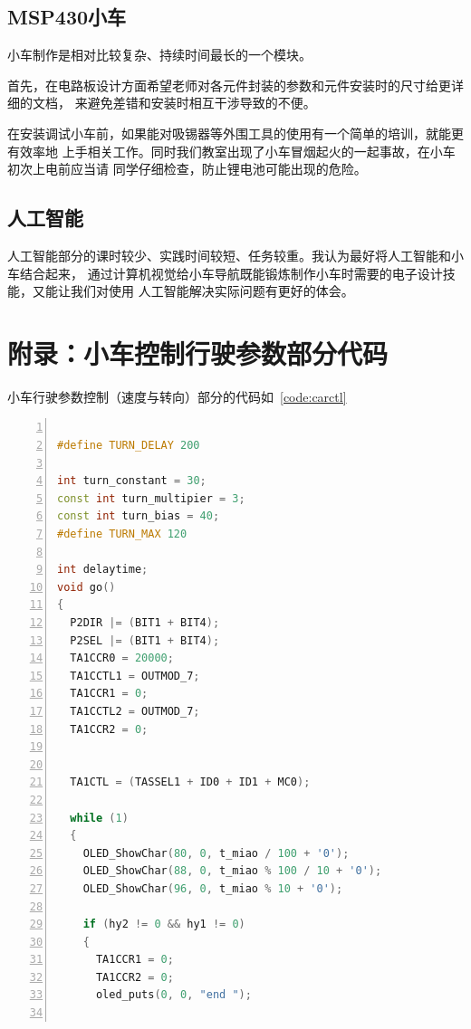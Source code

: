 \documentclass[a4paper,twoside,zihao=5,UTF8]{ctexart}
\begin{document}
\begin{spacing}{1.2}
\subsection{MSP430小车}

小车制作是相对比较复杂、持续时间最长的一个模块。

首先，在电路板设计方面希望老师对各元件封装的参数和元件安装时的尺寸给更详细的文档，
来避免差错和安装时相互干涉导致的不便。

在安装调试小车前，如果能对吸锡器等外围工具的使用有一个简单的培训，就能更有效率地
上手相关工作。同时我们教室出现了小车冒烟起火的一起事故，在小车初次上电前应当请
同学仔细检查，防止锂电池可能出现的危险。

\subsection{人工智能}

人工智能部分的课时较少、实践时间较短、任务较重。我认为最好将人工智能和小车结合起来，
通过计算机视觉给小车导航既能锻炼制作小车时需要的电子设计技能，又能让我们对使用
人工智能解决实际问题有更好的体会。

\clearpage

\appendix
\section*{附录：小车控制行驶参数部分代码}

小车行驶参数控制（速度与转向）部分的代码如~\ref{code:carctl}

\begin{lstlisting}[language=c++,numbers=left,style=CppStyle,caption=作业6,label={code:carctl}]

#define TURN_DELAY 200

int turn_constant = 30;
const int turn_multipier = 3;
const int turn_bias = 40;
#define TURN_MAX 120

int delaytime;
void go()
{
  P2DIR |= (BIT1 + BIT4);
  P2SEL |= (BIT1 + BIT4);
  TA1CCR0 = 20000;        
  TA1CCTL1 = OUTMOD_7;
  TA1CCR1 = 0; 
  TA1CCTL2 = OUTMOD_7;
  TA1CCR2 = 0; 

 
  TA1CTL = (TASSEL1 + ID0 + ID1 + MC0);

  while (1)
  {
    OLED_ShowChar(80, 0, t_miao / 100 + '0'); 
    OLED_ShowChar(88, 0, t_miao % 100 / 10 + '0');
    OLED_ShowChar(96, 0, t_miao % 10 + '0');

    if (hy2 != 0 && hy1 != 0) 
    {
      TA1CCR1 = 0; 
      TA1CCR2 = 0;
      oled_puts(0, 0, "end ");


\end{lstlisting}
\end{spacing}
\end{document}
